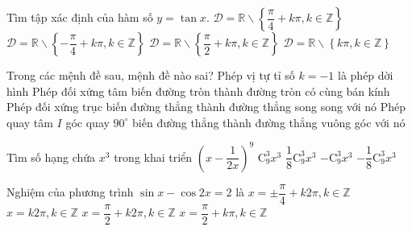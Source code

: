 \begin{ex}%
Tìm tập xác định của hàm số $y=\tan x$.
\choice
{$\mathscr{D} = \mathbb{R} \backslash \left \{\dfrac{\pi}{4} +k \pi, k \in \mathbb{Z}\right \}$}
{$\mathscr{D} = \mathbb{R} \backslash \left \{-\dfrac{\pi}{4} +k \pi, k \in \mathbb{Z}\right \}$}
{\True $\mathscr{D} = \mathbb{R} \backslash \left \{\dfrac{\pi}{2} +k \pi, k \in \mathbb{Z}\right \}$}
{$\mathscr{D} = \mathbb{R} \backslash \left \{k \pi, k \in \mathbb{Z}\right \}$}
\end{ex}


\begin{ex}%
Trong các mệnh đề sau, mệnh đề nào sai?
\choice
{Phép vị tự tỉ số $k=-1$ là phép dời hình}
{Phép đối xứng tâm biến đường tròn thành đường tròn có cùng bán kính}
{\True Phép đối xứng trục biến đường thẳng thành đường thẳng song song với nó}
{Phép quay tâm $I$  góc quay $90^\circ$ biến đường thẳng thành đường thẳng vuông góc với nó}
\loigiai{

}
\end{ex}

\begin{ex}%
Tìm số hạng chứa $x^3$ trong khai triển $\left (x- \dfrac{1}{2x}\right )^9$
\choice
{$\mathrm{C_9^3}x^3$}
{$\dfrac{1}{8}\mathrm{C_9^3}x^3$}
{$-\mathrm{C_9^3}x^3$}
{\True $-\dfrac{1}{8}\mathrm{C_9^3}x^3$}
\end{ex}

\begin{ex}%
Nghiệm của phương trình $\sin x -\cos 2x =2$ là 
\choice
{$x= \pm \dfrac{\pi}{4} + k2\pi, k \in \mathbb{Z}$}
{$x=  k2\pi, k \in \mathbb{Z}$}
{\True $x= \dfrac{\pi}{2} + k2\pi, k \in \mathbb{Z}$}
{$x=  \dfrac{\pi}{2} + k\pi, k \in \mathbb{Z}$}
\end{ex}

